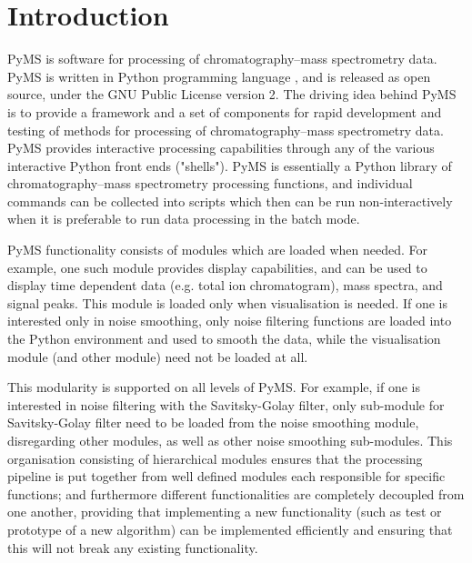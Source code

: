 

\chapter{Introduction}

PyMS is software for processing of chromatography--mass spectrometry data.
PyMS is written in Python programming language \cite{python}, and is
released as open source, under the GNU Public License version 2. The
driving idea behind PyMS is to provide a framework and a set of
components for rapid development and testing of methods for processing
of chromatography--mass spectrometry data. PyMS provides interactive
processing capabilities through any of the various interactive Python
front ends ("shells"). PyMS is essentially a Python library of
chromatography--mass spectrometry processing functions, and individual
commands can be collected into scripts which then can be run
non-interactively when it is preferable to run data processing in
the batch mode.

PyMS functionality consists of modules which are loaded when needed. 
For example, one such module provides display capabilities, and can
be used to display time dependent data (e.g. total ion chromatogram),
mass spectra, and signal peaks. This module is loaded only when
visualisation is needed. If one is interested only in noise smoothing,
only noise filtering functions are loaded into the Python environment
and used to smooth the data, while the visualisation module (and other
module) need not be loaded at all.

This modularity is supported on all levels of PyMS. For example, if
one is interested in noise filtering with the Savitsky-Golay filter,
only sub-module for Savitsky-Golay filter need to be loaded from
the noise smoothing module, disregarding other modules, as well
as other noise smoothing sub-modules. This organisation consisting
of hierarchical modules ensures that the processing pipeline is
put together from well defined modules each responsible for specific
functions; and furthermore different functionalities are completely
decoupled from one another, providing that implementing a new
functionality (such as test or prototype of a new algorithm) can
be implemented efficiently and ensuring that this will not break
any existing functionality.

